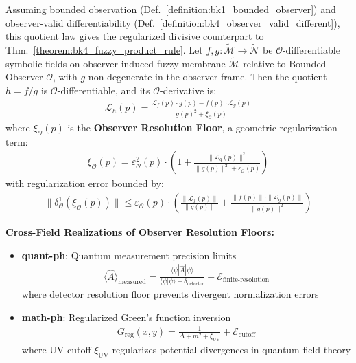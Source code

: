 \begin{theorem}
\label{theorem:bk4_fuzzy_quotient_rule}
Assuming bounded observation (Def.~\ref{definition:bk1_bounded_observer}) and observer-valid differentiability (Def.~\ref{definition:bk4_observer_valid_different}), this quotient law gives the regularized divisive counterpart to Thm.~\ref{theorem:bk4_fuzzy_product_rule}.
Let $f, g: \tilde{\mathcal{M}} \rightarrow \tilde{\mathcal{N}}$ be $\mathcal{O}$-differentiable symbolic fields on observer-induced fuzzy membrane $\tilde{\mathcal{M}}$ relative to Bounded Observer $\mathcal{O}$, with $g$ non-degenerate in the observer frame. Then the quotient $h = f/g$ is $\mathcal{O}$-differentiable, and its $\mathcal{O}$-derivative is:
\begin{align}
\mathcal{L}_h(p) = \frac{\mathcal{L}_f(p) \cdot g(p) - f(p) \cdot \mathcal{L}_g(p)}{g(p)^2 + \xi_{\mathcal{O}}(p)}
\end{align}
where $\xi_{\mathcal{O}}(p)$ is the \textbf{Observer Resolution Floor}, a geometric regularization term:
\begin{align}
\xi_{\mathcal{O}}(p) = \varepsilon_{\mathcal{O}}^2(p) \cdot \left(1 + \frac{\|\mathcal{L}_g(p)\|^2}{\|g(p)\|^2 + \varepsilon_{\mathcal{O}}(p)}\right)
\end{align}
with regularization error bounded by:
\begin{align}
\|\delta^1_{\mathcal{O}}(\xi_{\mathcal{O}}(p))\| \leq \varepsilon_{\mathcal{O}}(p) \cdot \left(\frac{\|\mathcal{L}_f(p)\|}{\|g(p)\|} + \frac{\|f(p)\| \cdot \|\mathcal{L}_g(p)\|}{\|g(p)\|^2}\right)
\end{align}

\textbf{Cross-Field Realizations of Observer Resolution Floors:}

\begin{itemize}
\item \textbf{quant-ph}: Quantum measurement precision limits
  \begin{align}
  \langle \hat{A} \rangle_{\text{measured}} = \frac{\langle \psi | \hat{A} | \psi \rangle}{\langle \psi | \psi \rangle + \delta_{\text{detector}}} + \mathcal{E}_{\text{finite-resolution}}
  \end{align}
  where detector resolution floor prevents divergent normalization errors
  
\item \textbf{math-ph}: Regularized Green's function inversion
  \begin{align}
  G_{\text{reg}}(x, y) = \frac{1}{\Delta + m^2 + \xi_{\text{UV}}} + \mathcal{E}_{\text{cutoff}}
  \end{align}
  where UV cutoff $\xi_{\text{UV}}$ regularizes potential divergences in quantum field theory
  

\end{itemize}
\end{theorem}
